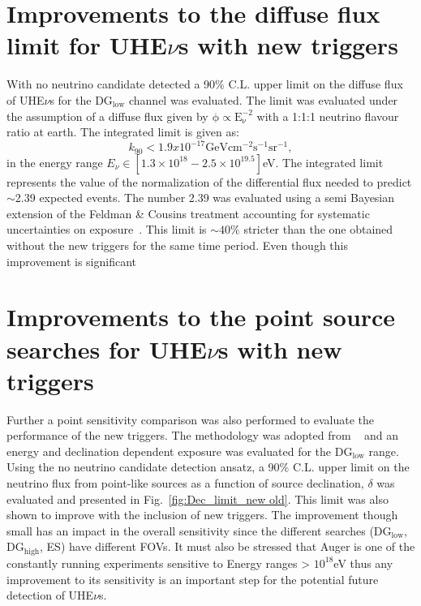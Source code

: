 \section*{Improvements to the diffuse flux limit for UHE$\nu$s with new triggers}
With no neutrino candidate detected a 90\% C.L. upper limit on the diffuse flux of UHE$\nu$s for the DG$\mathrm{_{low}}$ channel was evaluated. The limit was evaluated under the assumption of a diffuse flux given by $\mathrm{\phi \propto E_{\nu}^{-2}}$ with a 1:1:1 neutrino flavour ratio at earth. The integrated limit is given as:
\begin{equation}
    k_{90} < 1.9 x 10^{-17} \mathrm{GeV cm^{-2} s^{-1} sr^{-1}},
\end{equation}
in the energy range $E_{\nu} \in [1.3 \times 10^{18} - 2.5 \times 10^{19.5}]$eV. The integrated limit represents the value of the normalization of the differential flux needed to predict $\sim$2.39 expected events. The number 2.39 was evaluated using a semi Bayesian extension of the Feldman \& Cousins treatment accounting for systematic uncertainties on exposure~\cite{Conrad:2002kn}. This limit is $\sim 40\%$ stricter than the one obtained without the new triggers for the same time period. Even though this improvement is significant 
\section*{Improvements to the point source searches for UHE$\nu$s with new triggers}
Further a point sensitivity comparison was also performed to evaluate the performance of the new triggers. The methodology was adopted from ~\cite{Aab_2019_point} and an energy and declination dependent exposure was evaluated for the DG$\mathrm{_{low}}$ range. Using the no neutrino candidate detection ansatz, a 90\% C.L. upper limit on the neutrino flux from point-like sources as a function of source declination, $\delta$ was evaluated and presented in Fig.~\ref{fig:Dec_limit_new old}. This limit was also shown to improve with the inclusion of new triggers. The improvement though small has an impact in the overall sensitivity since the different searches (DG$\mathrm{_{low}}$, DG$\mathrm{_{high}}$, ES) have different FOVs. It must also be stressed that Auger is one of the constantly running experiments sensitive to Energy ranges > $10^{18}$eV thus any improvement to its sensitivity is an important step for the potential future detection of UHE$\nu$s.



